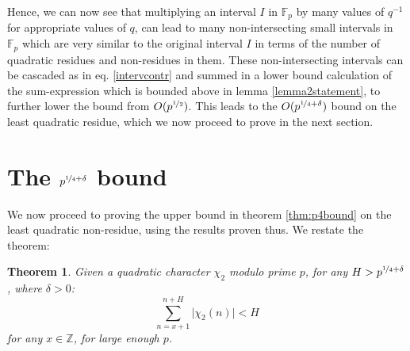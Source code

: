 \documentclass{report}
\newtheorem*{theorem*}{Theorem}
\begin{document}
Hence, we can now see that multiplying an interval $I$ in $\mathbb{F}_p$ by many values of $q^{-1}$ for appropriate values of $q$, can lead to many non-intersecting small intervals in $\mathbb{F}_p$ which are very similar to the original interval $I$ in terms of the number of quadratic residues and non-residues in them. These non-intersecting intervals can be cascaded as in eq. \ref{intervcontr} and summed in a lower bound calculation of the sum-expression which is bounded above in lemma \ref{lemma2statement}, to further lower the bound from $O(p^{\nicefrac{1}{2}})$. This leads to the $O(p^{\nicefrac{1}{4}+\delta})$ bound on the least quadratic residue, which we now proceed to prove in the next section.
%
%
\section{The $p^{\nicefrac{1}{4}+\delta}$ bound}
We now proceed to proving the upper bound in theorem \ref{thm:p4bound} on the least quadratic non-residue, using the results proven thus. We restate the theorem:
\begin{theorem*}
Given a quadratic character $\chi_2$ modulo prime $p$, for any $H>p^{\nicefrac{1}{4}+\delta}$, where $\delta>0$:
\[\sum\limits_{n=x+1}^{n+H}\lvert\chi_2(n)\rvert<H\]
for any $x\in\mathbb{Z}$, for large enough $p$.
\end{theorem*}
\end{document}
